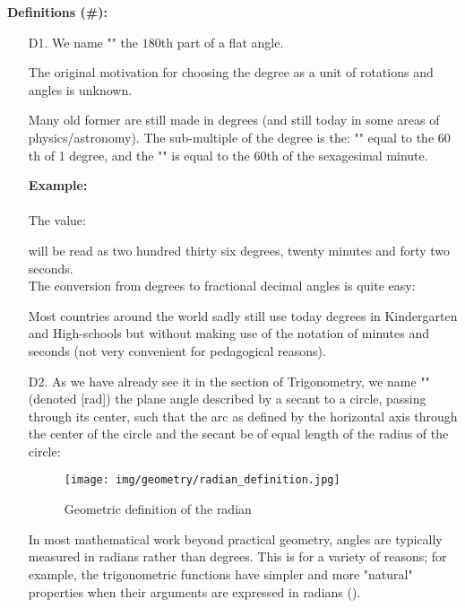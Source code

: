 	\textbf{Definitions (\#\mydef):}
	\begin{enumerate}
		\item[D1.] We name "" the $180$th part of a flat angle.
		
		\begin{tcolorbox}[title=Remark,colframe=black,arc=10pt]
		The original motivation for choosing the degree as a unit of rotations and angles is unknown.
		\end{tcolorbox}
		
		Many old former are still made in degrees (and still today in some areas of physics/astronomy). The sub-multiple of the degree is the: "" equal to the $60$th of 1 degree, and the "" is equal to the $60$th of the sexagesimal minute.
		
		\begin{tcolorbox}[colframe=black,colback=white,sharp corners]
		\textbf{{\Large {}}Example:}\\\\
		The value:
		
		 will be read as two hundred thirty six degrees, twenty minutes and forty two seconds.\\
		 
		 The conversion from degrees to fractional decimal angles is quite easy:
		
		\end{tcolorbox}
		Most countries around the world sadly still use today degrees in Kindergarten and High-schools but without making use of the notation of minutes and seconds (not very convenient for pedagogical reasons). 

		\item[D2.] As we have already see it in the section of Trigonometry, we name "" (denoted [rad]) the plane angle described by a secant to a circle, passing through its center, such that the arc as defined by the horizontal axis through the center of the circle and the secant be of equal length of the radius of the circle:
		\begin{figure}[H]
			\centering
			\texttt{[image: img/geometry/radian\_definition.jpg]}
			\caption{Geometric definition of the radian}
		\end{figure}

		In most mathematical work beyond practical geometry, angles are typically measured in radians rather than degrees. This is for a variety of reasons; for example, the trigonometric functions have simpler and more "natural" properties when their arguments are expressed in radians (). 
		

\end{enumerate}
